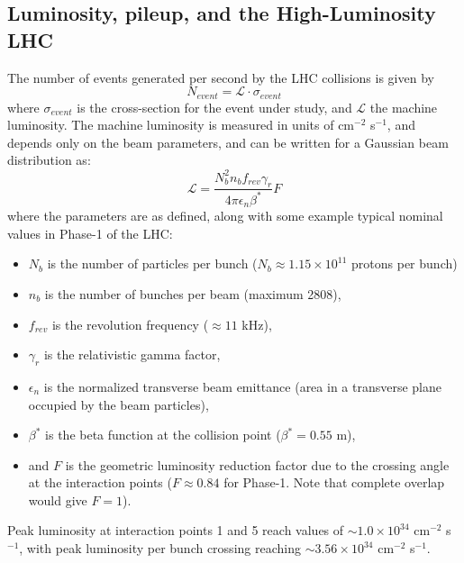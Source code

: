 \documentclass{article}
\begin{document}
\subsection{Luminosity, pileup, and the High-Luminosity LHC}
The number of events generated per second by the LHC collisions is given by
\begin{equation}
     N_{event} = \mathcal{L} \cdot \sigma_{event}
    \label{eqn:nEvents}
\end{equation} 
where $\sigma_{event}$ is the cross-section for the event under study, and $\mathcal{L}$ the machine luminosity. The machine luminosity is measured in units of cm$^{-2}$ s$^{-1}$, and depends only on the beam parameters, and can be written for a Gaussian beam distribution as:
\begin{equation}
    \mathcal{L} = \frac{N_b^2 n_b f_{rev} \gamma_r}{4\pi \epsilon_n \beta^*} F
\end{equation}
where the parameters are as defined, along with some example typical nominal values in Phase-1 of the LHC:
\begin{itemize}
    \item $N_b$ is the number of particles per bunch ($N_b \approx 1.15 \times 10^{11}$ protons per bunch)
    \item $n_b$ is the number of bunches per beam (maximum 2808),
    \item $f_{rev}$ is the revolution frequency ($\approx 11$ kHz),
    \item $\gamma_r$ is the relativistic gamma factor,
    \item $\epsilon_n$ is the normalized transverse beam emittance (area in a transverse plane occupied by the beam particles),
    \item $\beta^*$ is the beta function at the collision point ($\beta^* = 0.55$ m),
    \item and $F$ is the geometric luminosity reduction factor due to the crossing angle at the interaction points ($F \approx 0.84$ for Phase-1. Note that complete overlap would give $F = 1$).
\end{itemize}
Peak luminosity at interaction points 1 and 5 reach values of $\sim 1.0 \times 10^{34}$ cm$^{-2}$ s$^{-1}$, with peak luminosity per bunch crossing reaching $\sim 3.56 \times 10^{34}$ cm$^{-2}$ s$^{-1}$.
\end{document}
